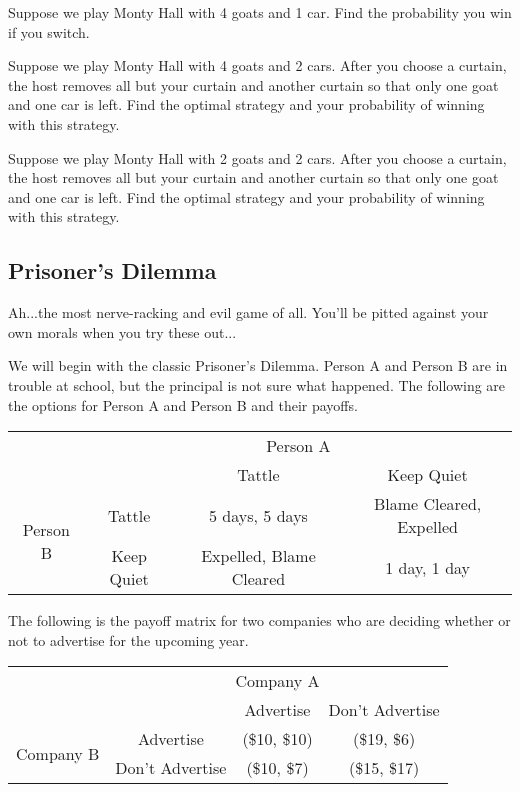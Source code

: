\begin{gm}
Suppose we play Monty Hall with 4 goats and 1 car. Find the probability you win if you switch.
\end{gm}

\begin{gm}
Suppose we play Monty Hall with 4 goats and 2 cars. After you choose a curtain, the host removes all but your curtain and another curtain so that only one goat and one car is left. Find the optimal strategy and your probability of winning with this strategy.
\end{gm}

\begin{gm}
Suppose we play Monty Hall with 2 goats and 2 cars. After you choose a curtain, the host removes all but your curtain and another curtain so that only one goat and one car is left. Find the optimal strategy and your probability of winning with this strategy.
\end{gm}

\subsection{Prisoner's Dilemma}
Ah...the most nerve-racking and evil game of all. You'll be pitted against your own morals when you try these out...

\begin{gm}
We will begin with the classic Prisoner's Dilemma. Person A and Person B are in trouble at school, but the principal is not sure what happened. The following are the options for Person A and Person B and their payoffs.
\begin{center}
\renewcommand{\arraystretch}{1.5} %
\begin{tabular}{cc|c|c}
     &\multicolumn{3}{c}{Person A} \\
     && Tattle & Keep Quiet \\
     \cline{2-4}
     \multirow{2}{*}{Person B}&Tattle & 5 days, 5 days & Blame Cleared, Expelled \\
     &Keep Quiet & Expelled, Blame Cleared & 1 day, 1 day
\end{tabular}
\end{center}
\end{gm}


\begin{gm}
The following is the payoff matrix for two companies who are deciding whether or not to advertise for the upcoming year.
\begin{center}
\renewcommand{\arraystretch}{1.5} %
\begin{tabular}{cc|c|c}
     &\multicolumn{3}{c}{Company A} \\
     && Advertise & Don't Advertise \\
     \cline{2-4}
     \multirow{2}{*}{Company B}& Advertise & (\$10, \$10) & (\$19, \$6) \\
     &Don't Advertise&(\$10, \$7) & (\$15, \$17) 
\end{tabular}
\end{center}
\end{gm}

